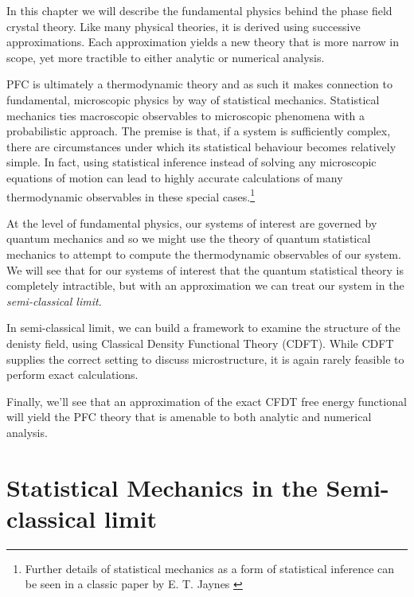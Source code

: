 In this chapter we will describe the fundamental physics behind the phase field crystal theory.
Like many physical theories, it is derived using successive approximations.
Each approximation yields a new theory that is more narrow in scope, yet more tractible to either analytic or numerical analysis.

PFC is ultimately a thermodynamic theory and as such it makes connection to fundamental, microscopic physics by way of statistical mechanics.
Statistical mechanics ties macroscopic observables to microscopic phenomena with a probabilistic approach.
The premise is that, if a system is sufficiently complex, there are circumstances under which its statistical behaviour becomes relatively simple.
In fact, using statistical inference instead of solving any microscopic equations of motion can lead to highly accurate calculations of many thermodynamic observables in these special cases.\footnote{Further details of statistical mechanics as a form of statistical inference can be seen in a classic paper by E. T. Jaynes \cite{JAYNES57}}

At the level of fundamental physics, our systems of interest are governed by quantum mechanics and so we might use the theory of quantum statistical mechanics to attempt to compute the thermodynamic observables of our system.
We will see that for our systems of interest that the quantum statistical theory is completely intractible, but with an approximation we can treat our system in the \textit{semi-classical limit}.

In semi-classical limit, we can build a framework to examine the structure of the denisty field, using Classical Density Functional Theory (CDFT).
While CDFT supplies the correct setting to discuss microstructure, it is again rarely feasible to perform exact calculations.

Finally, we'll see that an approximation of the exact CFDT free energy functional will yield the PFC theory that is amenable to both analytic and numerical analysis.

\section{Statistical Mechanics in the Semi-classical limit} %

